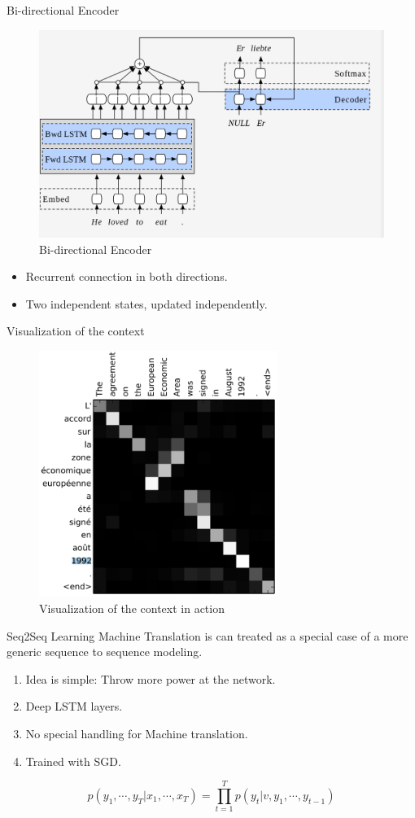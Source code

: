 ﻿\documentclass[aspectratio=43,mathserif,xcolor={usenames,dvipsnames,svgnames,table},10pt]{beamer}
\begin{document}
\begin{frame}{Bi-directional Encoder}
 
 \begin{figure}[h]
    \includegraphics[width=0.9\linewidth]{images/birnn.png}  
    \caption{Bi-directional Encoder}
  \end{figure}
  \begin{itemize}
   \item Recurrent connection in both directions.
   \item Two independent states, updated independently.
  \end{itemize}
\end{frame}

\begin{frame}{Visualization of the context}
 \begin{figure}[h]
    \includegraphics[height=8cm]{images/contextres.png}  
    \caption{Visualization of the context in action}
  \end{figure}
\end{frame}

\begin{frame}{Seq2Seq Learning}
 Machine Translation is can treated as a special case of a more generic sequence to sequence modeling.
 \begin{enumerate}
  \item Idea is simple: Throw more power at the network.
  \item Deep LSTM layers.
  \item No special handling for Machine translation.
  \item Trained with SGD.
 \end{enumerate}
$$ p(y_1, \cdots, y_T| x_1, \cdots, x_T) = \prod_{t=1}^{T} p(y_t| v, y_1, \cdots, y_{t-1})$$
\end{frame}
\end{document}
